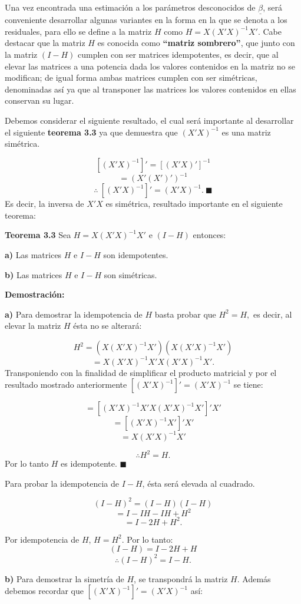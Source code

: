 \documentclass[
  a4paper,
  oneside,
  openany]{book}
\begin{document}
Una vez encontrada una estimación a los parámetros desconocidos de \(\underline{\beta}\), será conveniente desarrollar algunas variantes en la forma en la que se denota a los residuales, para ello se define a la matriz \(H\) como \(H=X(X'X)^{-1}X'.\) Cabe destacar que la matriz \(H\) es conocida como \textbf{``matriz sombrero''}, que junto con la matriz \((I-H)\) cumplen con ser matrices idempotentes, es decir, que al elevar las matrices a una potencia dada los valores contenidos en la matriz no se modifican; de igual forma ambas matrices cumplen con ser simétricas, denominadas así ya que al transponer las matrices los valores contenidos en ellas conservan su lugar.

Debemos considerar el siguiente resultado, el cual será importante al desarrollar el siguiente \textbf{teorema 3.3} ya que demuestra que \((X'X)^{-1}\) es una matriz simétrica.

\[[(X'X)^{-1}]'=[(X'X)']^{-1}\]
\[=(X'(X')')^{-1}\]
\[\therefore \  [(X'X)^{-1}]'= (X'X)^{-1}. \ \blacksquare\]
Es decir, la inversa de \(X'X\) es simétrica, resultado importante en el siguiente teorema:

\textbf{Teorema 3.3} Sea \(H=X(X'X)^{-1}X'\) e \((I-H)\) entonces:

\textbf{a)} Las matrices \(H\) e \(I-H\) son idempotentes.

\textbf{b)} Las matrices \(H\) e \(I-H\) son simétricas.

\textbf{Demostración:}

\textbf{a)} Para demostrar la idempotencia de \(H\) basta probar que \(H^2=H,\) es decir, al elevar la matriz \(H\) ésta no se alterará:

\[H^2=(X(X'X)^{-1}X')(X(X'X)^{-1}X')\]
\[=X(X'X)^{-1}X'X(X'X)^{-1}X'.\]
Transponiendo con la finalidad de simplificar el producto matricial y por el resultado mostrado anteriormente \([(X'X)^{-1}]'=(X'X)^{-1}\) se tiene:

\[=[(X'X)^{-1}X'X(X'X)^{-1}X']'X'\]
\[=[(X'X)^{-1}X']'X'\]
\[=X(X'X)^{-1}X'\]

\[\therefore H^2=H.\]
Por lo tanto \(H\) es idempotente. \(\blacksquare\)

Para probar la idempotencia de \(I-H\), ésta será elevada al cuadrado.

\[(I-H)^2=(I-H)(I-H)\]
\[=I-IH-IH+H^2\]
\[=I-2H+H^2.\]

Por idempotencia de \(H\), \(H=H^2\). Por lo tanto:
\[(I-H)=I-2H+H\]
\[\therefore (I-H)^2=I-H.\]

\textbf{b)} Para demostrar la simetría de \(H\), se transpondrá la matriz \(H\). Además debemos recordar que \([(X'X)^{-1}]'=(X'X)^{-1}\) así:
\end{document}

